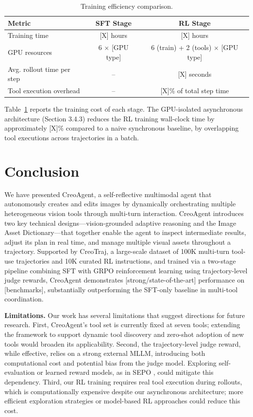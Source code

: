 \documentclass[11pt]{article}
\begin{document}
\begin{table}[t]
\centering
\caption{Training efficiency comparison.}
\label{tab:efficiency}
\begin{tabular}{lcc}
\toprule
\textbf{Metric} & \textbf{SFT Stage} & \textbf{RL Stage} \\
\midrule
Training time & [X] hours & [X] hours \\
GPU resources & 6 $\times$ [GPU type] & 6 (train) + 2 (tools) $\times$ [GPU type] \\
Avg. rollout time per step & -- & [X] seconds \\
Tool execution overhead & -- & [X]\% of total step time \\
\bottomrule
\end{tabular}
\end{table}



Table~\ref{tab:efficiency} reports the training cost of each stage. The GPU-isolated asynchronous architecture (Section 3.4.3) reduces the RL training wall-clock time by approximately [X]\% compared to a naive synchronous baseline, by overlapping tool executions across trajectories in a batch.


\section{Conclusion}

We have presented CreoAgent, a self-reflective multimodal agent that autonomously creates and edits images by dynamically orchestrating multiple heterogeneous vision tools through multi-turn interaction. CreoAgent introduces two key technical designs—vision-grounded adaptive reasoning and the Image Asset Dictionary—that together enable the agent to inspect intermediate results, adjust its plan in real time, and manage multiple visual assets throughout a trajectory. Supported by CreoTraj, a large-scale dataset of 100K multi-turn tool-use trajectories and 10K curated RL instructions, and trained via a two-stage pipeline combining SFT with GRPO reinforcement learning using trajectory-level judge rewards, CreoAgent demonstrates [strong/state-of-the-art] performance on [benchmarks], substantially outperforming the SFT-only baseline in multi-tool coordination.

\textbf{Limitations.} Our work has several limitations that suggest directions for future research. First, CreoAgent's tool set is currently fixed at seven tools; extending the framework to support dynamic tool discovery and zero-shot adoption of new tools would broaden its applicability. Second, the trajectory-level judge reward, while effective, relies on a strong external MLLM, introducing both computational cost and potential bias from the judge model. Exploring self-evaluation or learned reward models, as in SEPO \cite{lin2025jarvisevo}, could mitigate this dependency. Third, our RL training requires real tool execution during rollouts, which is computationally expensive despite our asynchronous architecture; more efficient exploration strategies or model-based RL approaches could reduce this cost.
\end{document}
